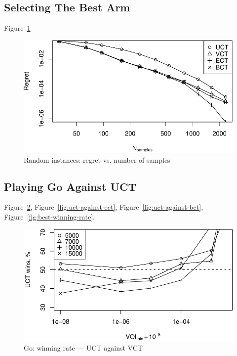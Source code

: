 \documentclass{article}
\begin{document}
\subsection{Selecting The Best Arm}
\label{sec:emp-arm}

Figure~\ref{fig:random-instances}

\begin{figure}[h]
\centering
\includegraphics[scale=0.8]{flat.pdf}
\caption{Random instances: regret vs. number of samples}
\label{fig:random-instances}
\end{figure}


\subsection{Playing Go Against UCT}
\label{sec:emp-go}

Figure~\ref{fig:uct-against-vct}, Figure~\ref{fig:uct-against-ect},
Figure~\ref{fig:uct-against-bct}, Figure~\ref{fig:best-winning-rate}.

\begin{figure}[h]
\centering
\includegraphics[scale=0.8]{vct-wins.pdf}
\caption{Go: winning rate --- UCT against VCT}
\label{fig:uct-against-vct}
\end{figure}
\end{document}
